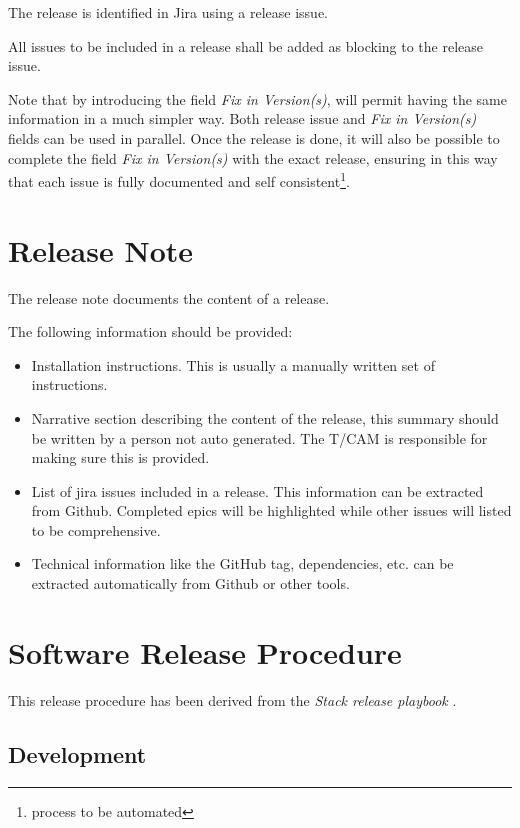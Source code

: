 The release is identified in Jira using a release issue.

All issues to be included in a release shall be added as blocking to the release issue.

Note that by introducing the field \textit{Fix in Version(s)}, will permit having the same information in a much simpler way.
Both release issue and \textit{Fix in Version(s)} fields can be used in parallel.
Once the release is done, it will also be possible to complete the field \textit{Fix in Version(s)} with the exact release,
ensuring in this way that each issue is fully documented and self consistent\footnote{process to be automated}.

\newpage
\section{Release Note} \label{sec:relnote}

The release note documents the content of a release.

The following information should be  provided:
\begin{itemize}
\item Installation instructions. This is usually a manually written set of instructions.
\item Narrative section describing the content of the release, this summary should be written by a person not auto generated.
The T/CAM is responsible for making sure this is provided.
\item List of jira issues included in a release. This information can be extracted from Github. Completed epics will be highlighted while other issues will  listed to be comprehensive.
\item Technical information like the GitHub tag, dependencies,  etc. can be extracted automatically from Github or other tools.
\end{itemize}


\newpage
\section{Software Release Procedure} \label{sec:releaseprocedure}

This release procedure has been derived from the \textit{Stack release playbook} .

\subsection{Development} \label{sec:dev}

